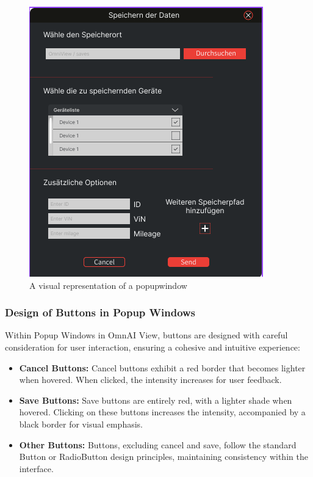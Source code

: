 \documentclass[]{scrreprt}
\begin{document}
\begin{figure}
    \includegraphics[width=.9\textwidth]{assets/pictures/Popupwindow_png.png}
    \caption[]{A visual representation of a popupwindow}
    \label{fig:popupwindow}
    \end{figure}




\subsubsection{Design of Buttons in Popup Windows}\label{cap:Designprinciples_PopupButtons}


Within Popup Windows in OmnAI View, buttons are designed with careful consideration for user interaction, ensuring a cohesive and intuitive experience:


\begin{itemize}
    \item \textbf{Cancel Buttons:} Cancel buttons exhibit a red border that becomes lighter when hovered. When clicked, the intensity increases for user feedback.
   
    \item \textbf{Save Buttons:} Save buttons are entirely red, with a lighter shade when hovered. Clicking on these buttons increases the intensity, accompanied by a black border for visual emphasis.
   
    \item \textbf{Other Buttons:} Buttons, excluding cancel and save, follow the standard Button or RadioButton design principles, maintaining consistency within the interface.
\end{itemize}
\end{document}
